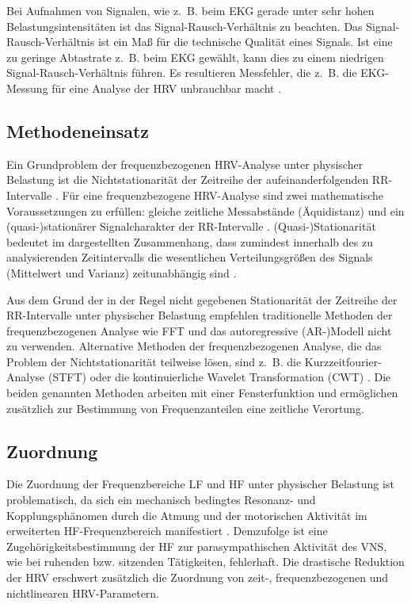 Bei Aufnahmen von Signalen, wie z.~B. beim \ac{EKG} gerade unter sehr hohen Belastungsintensitäten ist das Signal-Rausch-Verhältnis zu beachten. Das Signal-Rausch-Verhältnis ist ein Maß für die technische Qualität eines Signals. Ist eine zu geringe Abtastrate z.~B. beim \ac{EKG} gewählt, kann dies zu einem niedrigen Signal-Rausch-Verhältnis führen. Es resultieren Messfehler, die z.~B. die \ac{EKG}-Messung für eine Analyse der \ac{HRV} unbrauchbar macht \citep{Hoos2010}.

\subsection{Methodeneinsatz} 

\label{sub:methodeneinsatz}

Ein Grundproblem der frequenzbezogenen \ac{HRV}-Analyse unter physischer Belastung ist die Nichtstationarität der Zeitreihe der aufeinanderfolgenden RR-Intervalle \citep{Hottenrott2006}. Für eine frequenzbezogene \ac{HRV}-Analyse sind zwei mathematische Voraussetzungen zu erfüllen: gleiche zeitliche Messabstände (Äquidistanz) und ein (quasi-)stationärer Signalcharakter der RR-Intervalle \citep{Hoos2006}. (Quasi-)Stationarität bedeutet im dargestellten Zusammenhang, dass zumindest innerhalb des zu analysierenden Zeitintervalls die wesentlichen Verteilungsgrößen des Signals (Mittelwert und Varianz) zeitunabhängig sind \citep{Hoos2006}.

Aus dem Grund der in der Regel nicht gegebenen Stationarität der Zeitreihe der RR-Intervalle unter physischer Belastung empfehlen \citet[S.~113]{Sarmiento2013} traditionelle Methoden der frequenzbezogenen Analyse wie \acs{FFT} und das autoregressive (AR-)Modell nicht zu verwenden. Alternative Methoden der frequenzbezogenen Analyse, die das Problem der Nichtstationarität teilweise lösen, sind z.~B. die Kurzzeitfourier-Analyse (STFT) oder die kontinuierliche Wavelet Transformation (CWT) \citep[][S.~61f.]{Hoos2010}. Die beiden genannten Methoden arbeiten mit einer Fensterfunktion und ermöglichen zusätzlich zur Bestimmung von Frequenzanteilen eine zeitliche Verortung. 

\subsection{Zuordnung} 

\label{sub:zuordnung}

Die Zuordnung der Frequenzbereiche \acs{LF} und \acs{HF} unter physischer Belastung ist problematisch, da sich ein mechanisch bedingtes Resonanz- und Kopplungsphänomen durch die Atmung und der motorischen Aktivität im erweiterten \acs{HF}-Frequenzbereich manifestiert \citep[][S.~62]{Hoos2010}. Demzufolge ist eine Zugehörigkeitsbestimmung der \acs{HF} zur parasympathischen Aktivität des \ac{VNS}, wie bei ruhenden bzw. sitzenden Tätigkeiten, fehlerhaft. Die drastische Reduktion der \ac{HRV} erschwert zusätzlich die Zuordnung von zeit-, frequenzbezogenen und nichtlinearen \ac{HRV}-Parametern.

